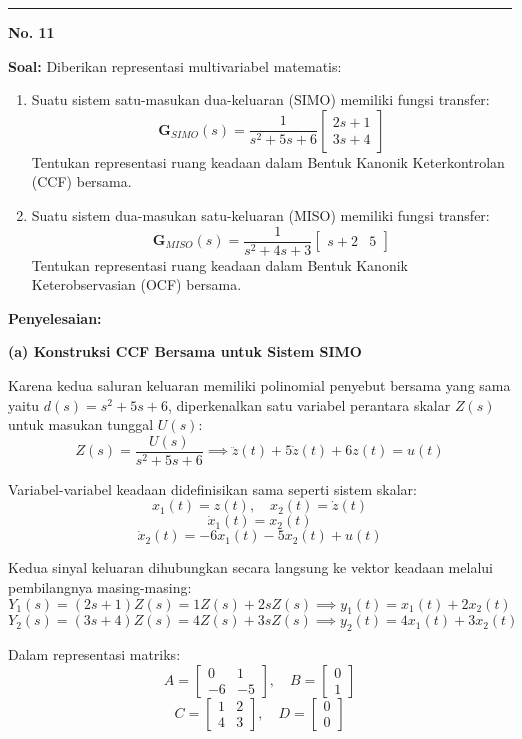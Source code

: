\documentclass[11pt,a4paper]{article}
\begin{document}
\vspace{12pt}
\hrule
\vspace{10pt}

\textbf{\large No. 11}

\textbf{Soal:}  
Diberikan representasi multivariabel matematis:
\begin{enumerate}[label=(\alph*)]
    \item Suatu sistem satu-masukan dua-keluaran (SIMO) memiliki fungsi transfer:
    $$\mathbf{G}_{SIMO}(s) = \frac{1}{s^2 + 5s + 6} \begin{bmatrix} 2s + 1 \\ 3s + 4 \end{bmatrix}$$
    Tentukan representasi ruang keadaan dalam Bentuk Kanonik Keterkontrolan (CCF) bersama.
    \item Suatu sistem dua-masukan satu-keluaran (MISO) memiliki fungsi transfer:
    $$\mathbf{G}_{MISO}(s) = \frac{1}{s^2 + 4s + 3} \begin{bmatrix} s + 2 & 5 \end{bmatrix}$$
    Tentukan representasi ruang keadaan dalam Bentuk Kanonik Keterobservasian (OCF) bersama.
\end{enumerate}

\textbf{Penyelesaian:}

\textbf{(a) Konstruksi CCF Bersama untuk Sistem SIMO}

Karena kedua saluran keluaran memiliki polinomial penyebut bersama yang sama yaitu $d(s) = s^2 + 5s + 6$, diperkenalkan satu variabel perantara skalar $Z(s)$ untuk masukan tunggal $U(s)$:
$$Z(s) = \frac{U(s)}{s^2 + 5s + 6} \implies \ddot{z}(t) + 5\dot{z}(t) + 6z(t) = u(t)$$

Variabel-variabel keadaan didefinisikan sama seperti sistem skalar:
$$x_1(t) = z(t), \quad x_2(t) = \dot{z}(t)$$
$$\dot{x}_1(t) = x_2(t)$$
$$\dot{x}_2(t) = -6x_1(t) - 5x_2(t) + u(t)$$

Kedua sinyal keluaran dihubungkan secara langsung ke vektor keadaan melalui pembilangnya masing-masing:
$$Y_1(s) = (2s + 1) Z(s) = 1 Z(s) + 2 s Z(s) \implies y_1(t) = x_1(t) + 2x_2(t)$$
$$Y_2(s) = (3s + 4) Z(s) = 4 Z(s) + 3 s Z(s) \implies y_2(t) = 4x_1(t) + 3x_2(t)$$

Dalam representasi matriks:
$$A = \begin{bmatrix} 0 & 1 \\ -6 & -5 \end{bmatrix}, \quad B = \begin{bmatrix} 0 \\ 1 \end{bmatrix}$$
$$C = \begin{bmatrix} 1 & 2 \\ 4 & 3 \end{bmatrix}, \quad D = \begin{bmatrix} 0 \\ 0 \end{bmatrix}$$
\end{document}
